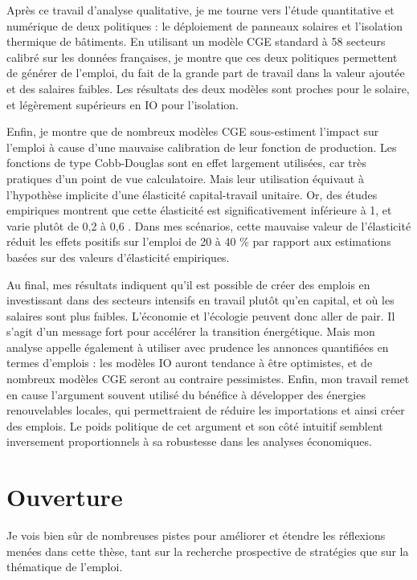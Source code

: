 Après ce travail d'analyse qualitative, je me tourne vers l'étude quantitative et numérique de deux politiques : le déploiement de panneaux solaires et l'isolation thermique de bâtiments. 
En utilisant un modèle CGE standard à 58 secteurs calibré sur les données françaises, je montre que ces deux politiques permettent de générer de l'emploi, du fait de la grande part de travail dans la valeur ajoutée et des salaires faibles. Les résultats des deux modèles sont proches pour le solaire, et légèrement supérieurs en IO pour l'isolation.

Enfin, je montre que de nombreux modèles CGE sous-estiment l’impact sur l’emploi à cause d'une mauvaise calibration de leur fonction de production. Les fonctions de type Cobb-Douglas sont en effet largement utilisées, car très pratiques d’un point de vue calculatoire. Mais leur utilisation équivaut à l'hypothèse implicite d’une élasticité capital-travail unitaire. Or, des études empiriques montrent que cette élasticité est significativement inférieure à 1, et varie plutôt de 0,2 à 0,6 \citep{VanderWerf2008}. Dans mes scénarios, cette mauvaise valeur de l’élasticité réduit les effets positifs sur l’emploi de 20 à 40 \% par rapport aux estimations basées sur des valeurs d'élasticité empiriques. 

Au final, mes résultats indiquent qu’il est possible de créer des emplois en investissant dans des secteurs intensifs en travail plutôt qu’en capital, et où les salaires sont plus faibles. L'économie et l'écologie peuvent donc aller de pair. Il s’agit d’un message fort pour accélérer la transition énergétique.
Mais mon analyse appelle également à utiliser avec prudence les annonces quantifiées en termes d’emplois : les modèles IO auront tendance à être optimistes, et de nombreux modèles CGE seront au contraire pessimistes.
Enfin, mon travail remet en cause l’argument souvent utilisé du bénéfice à développer des énergies renouvelables locales, qui permettraient de réduire les importations et ainsi créer des emplois. Le poids politique de cet argument et son côté intuitif semblent inversement proportionnels à sa robustesse dans les analyses économiques.


\section{Ouverture}

Je vois bien sûr de nombreuses pistes pour améliorer et étendre les réflexions menées dans cette thèse, tant sur la recherche prospective de stratégies que sur la thématique de l'emploi.

